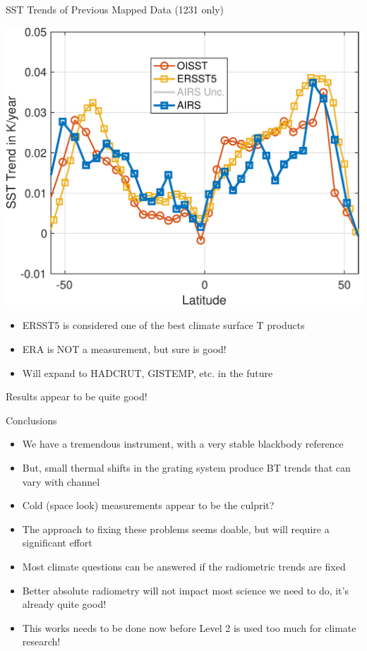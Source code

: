 \documentclass[10pt,t]{beamer}
\begin{document}
\begin{frame}[label={sec:org1355945}]{SST Trends of Previous Mapped Data (1231 \wn only)}
\begin{center}
\includegraphics[width=0.7\linewidth]{./Figs/Pdf/zonal_sst_trends_12311_vs_oisst_ersst5_hottest_per_grid_envelope.pdf}
\end{center}

\begin{footnotesize}
\begin{itemize}
\item ERSST5 is considered one of the best climate surface T products
\item ERA is NOT a measurement, but sure is good!
\item Will expand to HADCRUT, GISTEMP, etc. in the future
\end{itemize}

Results appear to be quite good! 
\end{footnotesize}
\end{frame}

\begin{frame}[label={sec:org286d8ac}]{Conclusions}
\begin{itemize}
\item We have a tremendous instrument, with a very stable blackbody reference
\item But, small thermal shifts in the grating system produce BT trends that can vary with channel
\item Cold (space look) measurements appear to be the culprit?
\item The approach to fixing these problems seems doable, but will require a significant effort
\item Most climate questions can be answered if the radiometric trends are fixed
\item Better absolute radiometry will not impact most science we need to do, it's already quite good!
\item This works needs to be done now before Level 2 is used too much for climate research!
\end{itemize}
\end{frame}
\end{document}
